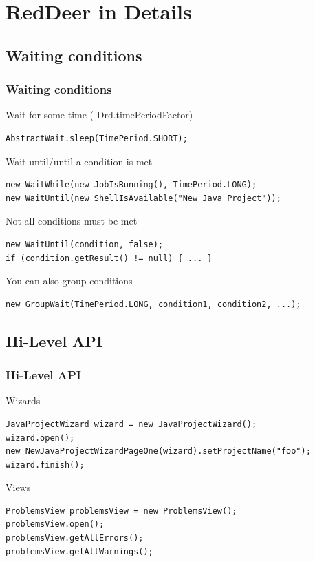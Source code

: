 \documentclass{beamer}
\begin{document}
\section{RedDeer in Details}

\subsection{Waiting conditions}
\begin{frame}[fragile]
\frametitle{Waiting conditions}
Wait for some time (-Drd.timePeriodFactor)
\begin{lstlisting}
AbstractWait.sleep(TimePeriod.SHORT);
\end{lstlisting}
\pause
Wait until/until a condition is met
\begin{lstlisting}
new WaitWhile(new JobIsRunning(), TimePeriod.LONG);
new WaitUntil(new ShellIsAvailable("New Java Project"));
\end{lstlisting}
\pause
Not all conditions must be met
\begin{lstlisting}
new WaitUntil(condition, false);
if (condition.getResult() != null) { ... }
\end{lstlisting}
\pause
You can also group conditions
\begin{lstlisting}
new GroupWait(TimePeriod.LONG, condition1, condition2, ...);
\end{lstlisting}
\end{frame}

\subsection{Hi-Level API}
\begin{frame}[fragile]
\frametitle{Hi-Level API}
\pause
Wizards
\begin{lstlisting}
JavaProjectWizard wizard = new JavaProjectWizard();
wizard.open();
new NewJavaProjectWizardPageOne(wizard).setProjectName("foo");
wizard.finish();
\end{lstlisting}
\vspace{0.5cm}
\pause
Views
\begin{lstlisting}
ProblemsView problemsView = new ProblemsView();
problemsView.open();
problemsView.getAllErrors();
problemsView.getAllWarnings();
\end{lstlisting}
\end{frame}
\end{document}
